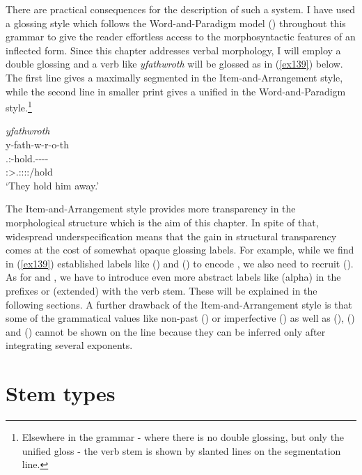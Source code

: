 There are practical consequences for the description of such a system. I have used a glossing style which follows the Word-and-Paradigm model (\citealt[67]{Matthews:1979vm}) throughout this grammar to give the reader effortless access to the morphosyntactic features of an inflected  form. Since this chapter addresses verbal morphology, I will employ a double glossing and a verb like \emph{yfathwroth} will be glossed as in (\ref{ex139}) below. The first line gives a maximally segmented  in the Item-and-Arrangement style, while the second line in smaller print gives a unified  in the Word-and-Paradigm style.\footnote{Elsewhere in the grammar - where there is no double glossing, but only the unified gloss - the verb stem is shown by slanted lines  on the segmentation line.}

\begin{exe}
	\ex \emph{yfathwroth}\\
	\glll y-fath-w-r-o-th\\
	\Tsg.\Masc:\Alph-hold.\Ext-\Ndu-\Lk-\Andat-\Stnsg\\
	\footnotesize{\Stpl:\Sbj>\Tsg.\Masc:\Obj:\Nonpast:\Ipfv:\Andat/hold}\\
	\trans `They hold him away.'
	\label{ex139}
\end{exe}

The Item-and-Arrangement style provides more transparency in the morphological structure which is the aim of this chapter. In spite of that, widespread underspecification means that the gain in structural transparency comes at the cost of somewhat opaque glossing labels. For example, while we find in (\ref{ex139}) established labels like \Sg{} () and \Nsg{} () to encode , we also need to recruit \Ndu{} (). As for  and , we have to introduce even more abstract labels like \Alph{} (alpha) in the prefixes or \Ext{} (extended) with the verb stem. These will be explained in the following sections. A further drawback of the Item-and-Arrangement style is that some of the grammatical values like non-past (\Nonpast) or imperfective (\Ipfv) as well as  (\Sbj),  (\Obj) and  (\Io) cannot be shown on the  line because they can be inferred only after integrating several exponents.

\section{Stem types} \label{roots-and-temp}

